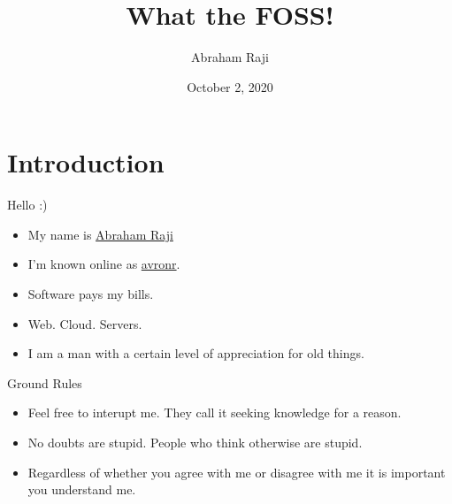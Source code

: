 \documentclass[presentation]{beamer}
\author{Abraham Raji}
\date{October 2, 2020}
\title{What the FOSS!}
\begin{document}
\maketitle
\section*{Introduction}
\label{sec:org75dc288}
\begin{frame}[label={sec:org8774129}]{Hello :)}
\begin{itemize}
\item My name is \href{https://abrahamraji.in}{Abraham Raji}
\item I'm known online as \href{mailto:avronr@tuta.io}{avronr}.
\item Software pays my bills.
\item Web. Cloud. Servers.
\item I am a man with a certain level of appreciation for old things.
\end{itemize}
\begin{block}{Ground Rules}
\begin{itemize}
\item Feel free to interupt me.
They call it seeking knowledge for a reason.
\item No doubts are stupid. People who think otherwise are stupid.
\item Regardless of whether you agree with me or disagree with me it is important you understand me.
\end{itemize}
\end{block}
\end{frame}
\end{document}
